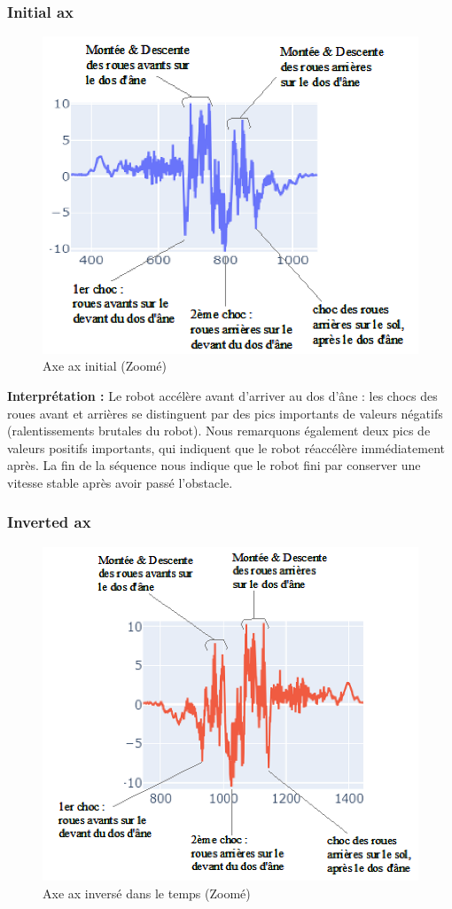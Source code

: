 \subsubsection{Initial ax}

\begin{figure}[H]
    \centering
    \includegraphics[width=0.5\linewidth]{img/initial_ax.png}
    \caption{Axe ax initial (Zoomé)}
\end{figure}

\textbf{Interprétation :} 
Le robot accélère avant d'arriver au dos d'âne : les chocs des roues avant et arrières se distinguent par des pics importants de valeurs négatifs (ralentissements brutales du robot). Nous remarquons également deux pics de valeurs positifs importants, qui indiquent que le robot réaccélère immédiatement après. La fin de la séquence nous indique que le robot fini par conserver une vitesse stable après avoir passé l'obstacle.

\subsubsection{Inverted ax}

\begin{figure}[H]
    \centering
    \includegraphics[width=0.5\linewidth]{img/reverted_ax.png}
    \caption{Axe ax inversé dans le temps (Zoomé)}
\end{figure}

